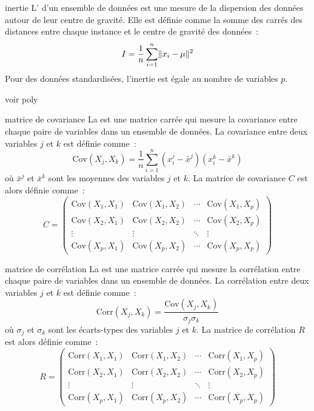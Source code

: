 \begin{definition}{}{inertie}
    L' d'un ensemble de données est une mesure de la dispersion des données autour de leur centre de gravité. Elle est définie comme la somme des carrés des distances entre chaque instance et le centre de gravité des données~:
    $$I = \frac{1}{n}\sum_{i=1}^n \lVert x_i - \mu\rVert^2$$
    Pour des données standardisées, l'inertie est égale au nombre de variables $p$.
\end{definition}

voir poly

\begin{definition}{}{matrice de covariance}
    La  est une matrice carrée qui mesure la covariance entre chaque paire de variables dans un ensemble de données. La covariance entre deux variables $j$ et $k$ est définie comme~:
    $$\text{Cov}(X_j, X_k) = \frac{1}{n}\sum_{i=1}^n (x_i^j - \bar{x}^j)(x_i^k - \bar{x}^k)$$
    où $\bar{x}^j$ et $\bar{x}^k$ sont les moyennes des variables $j$ et $k$. La matrice de covariance $C$ est alors définie comme~:
    $$C = \begin{pmatrix}
        \text{Cov}(X_1, X_1) & \text{Cov}(X_1, X_2) & \cdots & \text{Cov}(X_1, X_p) \\
        \text{Cov}(X_2, X_1) & \text{Cov}(X_2, X_2) & \cdots & \text{Cov}(X_2, X_p) \\
        \vdots & \vdots & \ddots & \vdots \\
        \text{Cov}(X_p, X_1) & \text{Cov}(X_p, X_2) & \cdots & \text{Cov}(X_p, X_p)
    \end{pmatrix}$$
\end{definition}

\begin{definition}{}{matrice de corrélation}
    La  est une matrice carrée qui mesure la corrélation entre chaque paire de variables dans un ensemble de données. La corrélation entre deux variables $j$ et $k$ est définie comme~:
    $$\text{Corr}(X_j, X_k) = \frac{\text{Cov}(X_j, X_k)}{\sigma_j \sigma_k}$$
    où $\sigma_j$ et $\sigma_k$ sont les écarts-types des variables $j$ et $k$. La matrice de corrélation $R$ est alors définie comme~:
    $$R = \begin{pmatrix}
        \text{Corr}(X_1, X_1) & \text{Corr}(X_1, X_2) & \cdots & \text{Corr}(X_1, X_p) \\
        \text{Corr}(X_2, X_1) & \text{Corr}(X_2, X_2) & \cdots & \text{Corr}(X_2, X_p) \\
        \vdots & \vdots & \ddots & \vdots \\
        \text{Corr}(X_p, X_1) & \text{Corr}(X_p, X_2) & \cdots & \text{Corr}(X_p, X_p)
    \end{pmatrix}$$
\end{definition}

